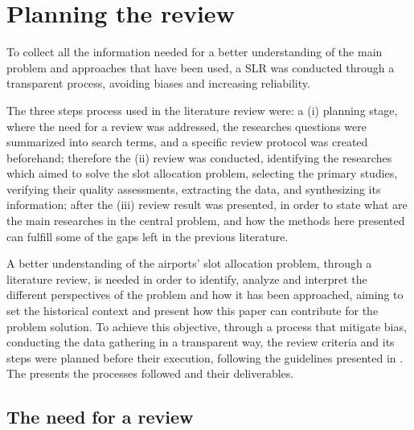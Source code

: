 \section{Planning the review}
\label{section:Planning}

To collect all the information needed for a better understanding of the main problem and approaches that have been used, a \acrfull{SLR} was conducted through a transparent process, avoiding biases and increasing reliability.

The three steps process used in the literature review were: a (i) planning stage, where the need for a review was addressed, the researches questions were summarized into search terms, and a specific review protocol was created beforehand; therefore the (ii) review was conducted, identifying the researches which aimed to solve the slot allocation problem, selecting the primary studies, verifying their quality assessments, extracting the data, and synthesizing its information; after the (iii) review result was presented, in order to state what are the main researches in the central problem, and how the methods here presented can fulfill some of the gaps left in the previous literature.

A better understanding of the airports' slot allocation problem, through a literature review, is needed in order to identify, analyze and interpret the different perspectives of the problem and how it has been approached, aiming to set the historical context and present how this paper can contribute for the problem solution. To achieve this objective, through a process that mitigate bias, conducting the data gathering in a transparent way, the review criteria and its steps were planned before their execution, following the guidelines presented in \cite{wohlin2012experimentation, shamseer2015prisma}. The  presents the processes followed and their deliverables.

%

\subsection{The need for a review}

